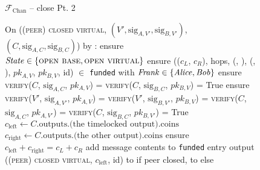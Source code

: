 \begin{figure}[H]
  \begin{systembox}{$\mathcal{F}_{\mathrm{Chan}}$ -- close Pt. 2}
    \begin{algorithmic}[1]
      \State On (\textsc{(peer) closed virtual}, $(V', \mathrm{sig}_{A, V'},
      \mathrm{sig}_{B, V'})$, $(C, \mathrm{sig}_{A, C}, \mathrm{sig}_{B, C})$)
      by \charlie:
      \Indent
        \State ensure $\mathit{State} \in \{\textsc{open base}, \textsc{open
        virtual}\}$
        \State ensure (($c_L$, $c_R$), hops, (\charlie, \dave), (\frank,
        \george), $pk_{A, V}$, $pk_{B, V}$, id) $\in$ \texttt{funded}
        with $\mathit{Frank} \in \{\mathit{Alice}, \mathit{Bob}\}$ 
          \State ensure \textsc{verify}($C$, $\mathrm{sig}_{A, C}$, $pk_{A, V}$)
          = \textsc{verify}($C$, $\mathrm{sig}_{B, C}$, $pk_{B, V}$) = True
        \Else
          \State ensure \textsc{verify}($V'$, $\mathrm{sig}_{A, V'}$, $pk_{A,
          V}$) = \textsc{verify}($V'$, $\mathrm{sig}_{B, V'}$, $pk_{B, V}$) =
          \textsc{verify}($C$, $\mathrm{sig}_{A, C}$, $pk_{A, V'}$) =
          \textsc{verify}($C$, $\mathrm{sig}_{B, C}$, $pk_{B, V'}$) = True
        \EndIf
        \State $c_{\mathrm{left}} \gets C\text{.outputs.(the timelocked
        output).coins}$
        \State $c_{\mathrm{right}} \gets C\text{.outputs.(the other
        output).coins}$
        \State ensure $c_{\mathrm{left}} + c_{\mathrm{right}} = c_L + c_R$
        \State add message contents to \texttt{funded} entry
        \State output (\textsc{(peer) closed virtual}, $c_{\mathrm{left}}$, id) to
        \george if peer closed, to \frank else
      \EndIndent
    \end{algorithmic}
  \end{systembox}
  \caption{}
  \label{code:functionality:chan:skeleton:close:pt2}
\end{figure}

